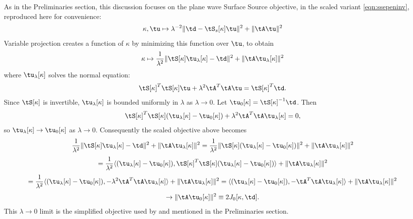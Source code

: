 As in the Preliminaries section, this discussion focuses on the plane wave
Surface Source objective, in the scaled variant \ref{eqn:ssepeninv},
reproduced here for convenience:
\begin{equation}
  \label{eqn:ssepeninv1}
  \kappa,\tu \mapsto \lambda^{-2}\|\td-\tS_s[\kappa]\tu\|^2 + \|\tA\tu\|^2
\end{equation}
Variable projection creates a function of $\kappa$ by minimizing this
function over $\tu$, to obtain
\[
\kappa \mapsto \frac{1}{\lambda^2}\|\tS[\kappa]\tu_{\lambda}[\kappa]-\td\|^2 + \|\tA
\tu_{\lambda}[\kappa]\|^2
\]
where $\tu_{\lambda}[\kappa]$ solves the normal equation:
\[
\tS[\kappa]^T\tS[\kappa]\tu  + \lambda^2\tA^T\tA\tu = \tS[\kappa]^T\td.
\]
Since $\tS[\kappa]$ is invertible, $\tu_{\lambda}[\kappa]$ is
bounded uniformly in $\lambda$ as $\lambda \rightarrow 0$. Let $\tu_0[\kappa] =
\tS[\kappa]^{-1}\td$. Then
\[
\tS[\kappa]^T\tS[\kappa](\tu_{\lambda}[\kappa]-\tu_0[\kappa])+\lambda^2\tA^T\tA\tu_{\lambda}[\kappa]
= 0,
\]
so $\tu_{\lambda}[\kappa] \rightarrow \tu_0[\kappa]$ as $\lambda
\rightarrow 0$. Consequently the scaled objective above becomes
\[
\frac{1}{\lambda^2}\|\tS[\kappa]\tu_{\lambda}[\kappa]-\td\|^2 + \|\tA 
\tu_{\lambda}[\kappa]\|^2
=\frac{1}{\lambda^2}\|\tS[\kappa](\tu_{\lambda}[\kappa]-\tu_0[\kappa])\|^2 + \|\tA 
\tu_{\lambda}[\kappa]\|^2
\]
\[
=\frac{1}{\lambda^2}\langle (\tu_{\lambda}[\kappa]-\tu_0[\kappa]),
\tS[\kappa]^T\tS[\kappa](\tu_{\lambda}[\kappa]-\tu_0[\kappa])\rangle+ \|\tA 
\tu_{\lambda}[\kappa]\|^2
\]
\[
=\frac{1}{\lambda^2}\langle (\tu_{\lambda}[\kappa]-\tu_0[\kappa]),
-\lambda^2\tA^T\tA \tu_{\lambda}[\kappa] \rangle + \|\tA\tu_{\lambda}[\kappa]\|^2
=\langle (\tu_{\lambda}[\kappa]-\tu_0[\kappa]),
-\tA^T\tA \tu_{\lambda}[\kappa] \rangle + \|\tA\tu_{\lambda}[\kappa]\|^2
\]
\begin{equation}
\label{eqn:j0def}
\rightarrow \|\tA\tu_0[\kappa]\|^2 \equiv 2 J_0[\kappa,\td].
\end{equation}
This $\lambda \rightarrow 0$ limit is the simplified objective used by
\cite{Symes:EAGE15} and mentioned in the Preliminaries section.


